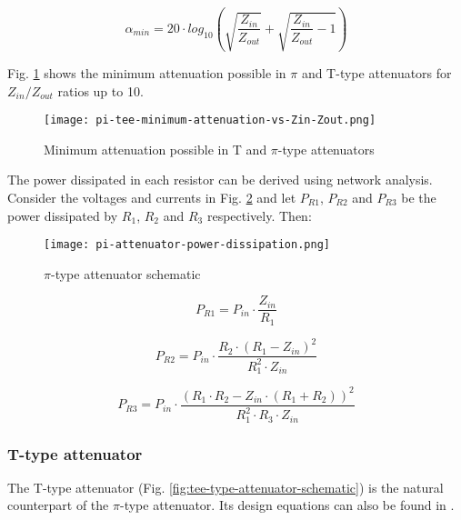 \begin{equation}
    \alpha_{min} = 20 \cdot log_{10} \left( \sqrt{\frac{Z_{in}}{Z_{out}}} + \sqrt{\frac{Z_{in}}{Z_{out}}-1} \right)
    \label{eq:min_att_pi}
\end{equation}


\noindent Fig. \ref{fig:tee-type-minimum-attenuation} shows the minimum attenuation possible in $\pi$ and T-type attenuators for $Z_{in} / Z_{out}$ ratios up to 10.

\begin{figure}[H]
    \centering
    \texttt{[image: pi-tee-minimum-attenuation-vs-Zin-Zout.png]}
    \caption{Minimum attenuation possible in T and $\pi$-type attenuators}
    \label{fig:tee-type-minimum-attenuation}
\end{figure}

\noindent The power dissipated in each resistor can be derived using network analysis. Consider the voltages and currents in Fig. \ref{fig:power-dissipation-pi-type-attenuator} and let $P_{R1}$, $P_{R2}$ and $P_{R3}$ be the power dissipated by $R_1$, $R_2$ and $R_3$ respectively. Then:

\begin{figure}[H]
    \centering
    \texttt{[image: pi-attenuator-power-dissipation.png]}
    \caption{$\pi$-type attenuator schematic}
    \label{fig:power-dissipation-pi-type-attenuator}
\end{figure}

\begin{equation}
    P_{R1} = P_{in} \cdot \frac{Z_{in}}{R_1}
\end{equation}

\begin{equation}
    P_{R2} = P_{in} \cdot  \frac{R_2 \cdot (R_1 - Z_{in})^2}{R_1^2 \cdot Z_{in}}
\end{equation}

\begin{equation}
    P_{R3} = P_{in} \cdot \frac{\left( R_1 \cdot R_2 - Z_{in} \cdot (R_1 + R_2) \right)^2}{R_1^2 \cdot R_3 \cdot Z_{in}}
\end{equation}

\subsubsection{T-type attenuator}

\noindent The T-type attenuator (Fig. \ref{fig:tee-type-attenuator-schematic}) is the natural counterpart of the $\pi$-type attenuator. Its design equations can also be found in \cite{vizmuller1995rf}.



